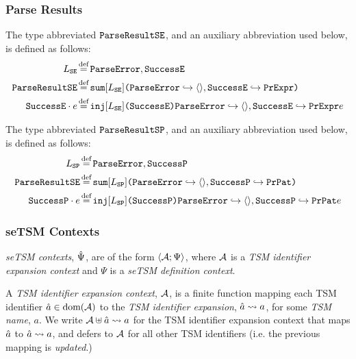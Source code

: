 \subsubsection{Parse Results}
 The type abbreviated $\mathtt{ParseResultSE}$, and an auxiliary abbreviation used below, is defined as follows:
\begin{align*}
L_\mathtt{SE} & \defeq \lbltxt{ParseError}, \lbltxt{SuccessE}\\
\tParseResultExp & \defeq \asum{L_\mathtt{SE}}{
  \mapitem{\lbltxt{ParseError}}{\prodt{}}, 
  \mapitem{\lbltxt{SuccessE}}{\tCEExp}
}\\
\lbltxt{SuccessE}\cdot e & \defeq \aein{L_\mathtt{SE}}{\mathtt{SuccessE}}{\mapitem{\mathtt{ParseError}}{\tpl{}}, \mapitem{\mathtt{SuccessE}}{\tCEExp}}{e}
\end{align*} %

\begin{grayparbox}
 The type abbreviated $\mathtt{ParseResultSP}$, and an auxiliary abbreviation used below, is defined as follows:
\begin{align*}
L_\mathtt{SP} & \defeq \lbltxt{ParseError}, \lbltxt{SuccessP}\\
\tParseResultExp & \defeq \asum{L_\mathtt{SP}}{
  \mapitem{\lbltxt{ParseError}}{\prodt{}}, 
  \mapitem{\lbltxt{SuccessP}}{\tCEPat}
}\\
\lbltxt{SuccessP}\cdot e & \defeq \aein{L_\mathtt{SP}}{\mathtt{SuccessP}}{\mapitem{\mathtt{ParseError}}{\tpl{}}, \mapitem{\mathtt{SuccessP}}{\tCEPat}}{e}
\end{align*} %
\end{grayparbox}

\subsubsection{seTSM Contexts}

\emph{seTSM contexts}, $\hat{\Psi}$, are of the form $\langle \mathcal{A}; \Psi \rangle$, where $\mathcal{A}$ is a \emph{TSM identifier expansion context} and $\Psi$ is a \emph{seTSM definition context}. 

A \emph{TSM identifier expansion context}, $\mathcal{A}$, is a finite function mapping each TSM identifier $\hat{a} \in \text{dom}(\mathcal{A})$ to the \emph{TSM identifier expansion}, $\hat{a} \leadsto a$, for some \emph{TSM name}, $a$. We write $\mathcal{A} \uplus \hat{a} \leadsto a$ for the TSM identifier expansion context that maps $\hat{a}$ to $\hat{a} \leadsto a$, and defers to $\mathcal{A}$ for all other TSM identifiers (i.e. the previous mapping is \emph{updated}.)

